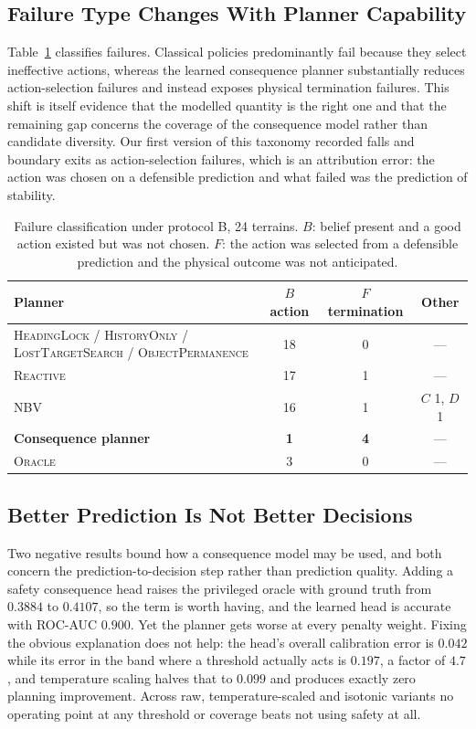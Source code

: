 \documentclass[conference]{IEEEtran}
\begin{document}
\subsection{Failure Type Changes With Planner Capability}

Table~\ref{tab:taxonomy} classifies failures. Classical policies predominantly fail
because they select ineffective actions, whereas the learned consequence planner
substantially reduces action-selection failures and instead exposes physical
termination failures. This shift is itself evidence that the modelled quantity is the
right one and that the remaining gap concerns the coverage of the consequence model
rather than candidate diversity. Our first version of this taxonomy recorded falls and
boundary exits as action-selection failures, which is an attribution error: the action
was chosen on a defensible prediction and what failed was the prediction of
stability.

\begin{table}[t]
\caption{Failure classification under protocol B, 24 terrains. $B$: belief present and
a good action existed but was not chosen. $F$: the action was selected from a
defensible prediction and the physical outcome was not anticipated.}
\label{tab:taxonomy}
\centering
\small
\begin{tabular}{@{}lccc@{}}
\toprule
Planner & $B$ action & $F$ termination & Other\\
\midrule
\textsc{HeadingLock} / \textsc{HistoryOnly} / \textsc{LostTargetSearch} /
  \textsc{ObjectPermanence} & 18 & 0 & ---\\
\textsc{Reactive}      & 17 & 1 & ---\\
\textsc{NBV}           & 16 & 1 & $C$ 1, $D$ 1\\
\textbf{Consequence planner} & \textbf{1} & \textbf{4} & ---\\
\textsc{Oracle}        & 3 & 0 & ---\\
\bottomrule
\end{tabular}
\end{table}

\subsection{Better Prediction Is Not Better Decisions}

Two negative results bound how a consequence model may be used, and both concern the
prediction-to-decision step rather than prediction quality. Adding a safety
consequence head raises the privileged oracle with ground truth from $0.3884$ to
$0.4107$, so the term is worth having, and the learned head is accurate with
ROC-AUC $0.900$. Yet the planner gets worse at every penalty weight. Fixing the
obvious explanation does not help: the head's overall calibration error is $0.042$
while its error in the band where a threshold actually acts is $0.197$, a factor of
$4.7$, and temperature scaling halves that to $0.099$ and produces exactly zero
planning improvement. Across raw, temperature-scaled and isotonic variants no
operating point at any threshold or coverage beats not using safety at all.
\end{document}
